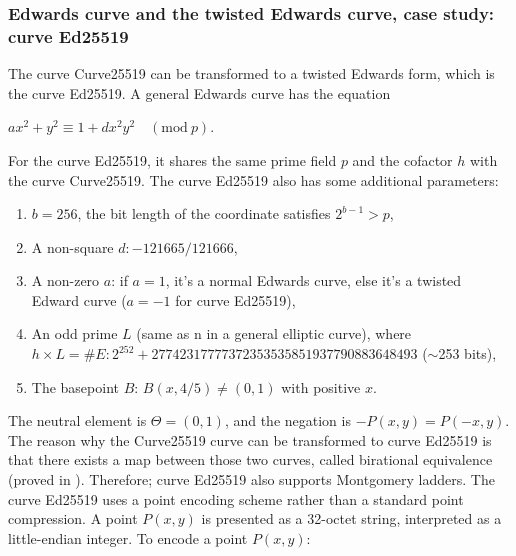 \subsubsection{Edwards curve and the twisted Edwards curve, case study: curve Ed25519}
The curve Curve25519 can be transformed to a twisted Edwards form, which is the curve Ed25519. A general Edwards curve has the equation

\begin{center}
  $ax^2 + y^2 \equiv 1 + dx^2 y^2 \quad (\text{mod} \ p)$.
\end{center}

For the curve Ed25519, it shares the same prime field $p$ and the cofactor $h$ with the curve Curve25519. The curve Ed25519 also has some additional parameters:

\begin{enumerate}
  \item $b = 256$, the bit length of the coordinate satisfies $2^{b-1} > p$,
  \item A non-square $d: -121665/121666$,
  \item A non-zero $a$: if $a = 1$, it's a normal Edwards curve, else it's a twisted Edward curve ($a = -1$ for curve Ed25519),
  \item An odd prime $L$ (same as n in a general elliptic curve), where $h \times L = \#E: 2^{252}+27742317777372353535851937790883648493$ ($\sim$253 bits),
  \item The basepoint $B$: $B(x, 4/5) \neq (0, 1)$ with positive $x$.
\end{enumerate}

The neutral element is $\Theta = (0,1)$, and the negation is $-P(x, y) = P(-x, y)$. The reason why the Curve25519 curve can be transformed to curve Ed25519 is that there exists a map between those two curves, called birational equivalence (proved in \cite{Bernstein2011}). Therefore; curve Ed25519 also supports Montgomery ladders. The curve Ed25519 uses a point encoding scheme rather than a standard point compression. A point $P(x, y)$ is presented as a 32-octet string, interpreted as a little-endian integer. To encode a point $P(x, y)$:

